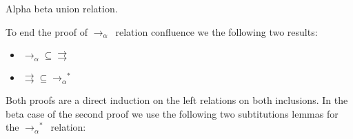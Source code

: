 \documentclass{article}
\newcommand{\p}{\ensuremath{\rightrightarrows}}
\newcommand{\betaalpha}{\ensuremath{\rightarrow_\alpha}}
\begin{document}

Alpha beta union relation.


To end the proof of \betaalpha\ relation confluence we the following two results:

\begin{itemize}
\item $\betaalpha \subseteq \p$
\item $\p \subseteq \betaalpha^*$
\end{itemize}

Both proofs are a direct induction on the left relations on both inclusions. In the beta case of the second proof we use the following two subtitutions lemmas for the $\betaalpha^*$\ relation:

\end{document}
